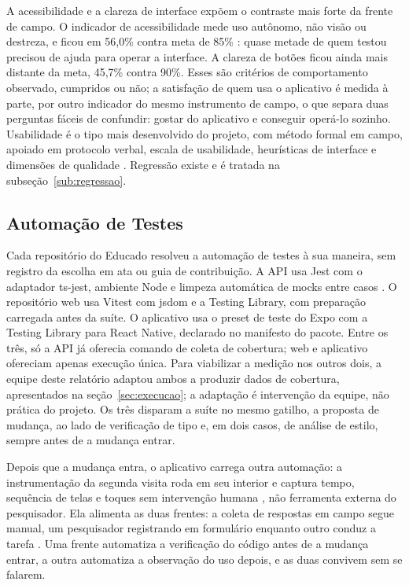 A acessibilidade e a clareza de interface expõem o contraste mais forte da
frente de campo. O indicador de acessibilidade mede uso autônomo, não visão ou
destreza, e ficou em 56,0\% contra meta de 85\% \cite{dashboard}: quase metade de
quem testou precisou de ajuda para operar a interface. A clareza de botões ficou
ainda mais distante da meta, 45,7\% contra 90\%. Esses são critérios de
comportamento observado, cumpridos ou não; a satisfação de quem usa o aplicativo
é medida à parte, por outro indicador do mesmo instrumento de campo, o que separa
duas perguntas fáceis de confundir: gostar do aplicativo e conseguir operá-lo
sozinho. Usabilidade é o tipo mais desenvolvido do projeto, com método formal em
campo, apoiado em protocolo verbal, escala de usabilidade, heurísticas de
interface e dimensões de qualidade
\cite{ericsson1984,brooke1996,nielsen1993,garvin1998}. Regressão existe e é
tratada
na subseção~\ref{sub:regressao}.


\subsection{Automação de Testes}

Cada repositório do Educado resolveu a automação de testes à sua maneira, sem
registro da escolha em ata ou guia de contribuição. A API usa Jest com o
adaptador ts-jest, ambiente Node e limpeza automática de mocks entre casos
\cite{educado-repos}. O repositório web usa Vitest com jsdom e a Testing
Library, com preparação carregada antes da suíte. O aplicativo usa o preset de
teste do Expo com a Testing Library para React Native, declarado no manifesto do
pacote. Entre os três, só a API já oferecia comando de coleta de cobertura; web e
aplicativo ofereciam apenas execução única. Para viabilizar a medição nos outros
dois, a equipe deste relatório adaptou ambos a produzir dados de cobertura,
apresentados na seção~\ref{sec:execucao}; a adaptação é intervenção da equipe,
não prática do projeto. Os três disparam a suíte no mesmo gatilho, a proposta de
mudança, ao lado de verificação de tipo e, em dois casos, de análise de estilo,
sempre antes de a mudança entrar.

Depois que a mudança entra, o aplicativo carrega outra automação: a
instrumentação da segunda visita roda em seu interior e captura tempo, sequência
de telas e toques sem intervenção humana \cite{dashboard}, não ferramenta externa
do pesquisador. Ela alimenta as duas frentes: a coleta de respostas em campo
segue manual, um pesquisador registrando em formulário enquanto outro conduz a
tarefa \cite[p.~16]{psp5}. Uma frente automatiza a verificação do código antes de
a mudança entrar, a outra automatiza a observação do uso depois, e as duas
convivem sem se falarem.

